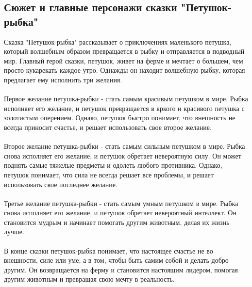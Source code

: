 \documentclass{article}
\begin{document}
\subsection{Сюжет и главные персонажи сказки "{}{}Петушок-рыбка"{}{}}
Сказка "{}{}Петушок-рыбка"{}{} рассказывает о приключениях маленького петушка, который волшебным образом превращается в рыбку и отправляется в подводный мир. Главный герой сказки, петушок, живет на ферме и мечтает о большем, чем просто кукарекать каждое утро. Однажды он находит волшебную рыбку, которая предлагает ему исполнить три желания.\\
~\\
Первое желание петушка-рыбки - стать самым красивым петушком в мире. Рыбка исполняет его желание, и петушок превращается в яркого и красивого петушка с золотистым оперением. Однако, петушок быстро понимает, что внешность не всегда приносит счастье, и решает использовать свое второе желание.\\
~\\
Второе желание петушка-рыбки - стать самым сильным петушком в мире. Рыбка снова исполняет его желание, и петушок обретает невероятную силу. Он может поднять самые тяжелые предметы и одолеть любого противника. Однако, петушок понимает, что сила не всегда решает все проблемы, и решает использовать свое последнее желание.\\
~\\
Третье желание петушка-рыбки - стать самым умным петушком в мире. Рыбка снова исполняет его желание, и петушок обретает невероятный интеллект. Он становится мудрым и начинает помогать другим животным, делая их жизнь лучше.\\
~\\
В конце сказки петушок-рыбка понимает, что настоящее счастье не во внешности, силе или уме, а в том, чтобы быть самим собой и делать добро другим. Он возвращается на ферму и становится настоящим лидером, помогая другим животным и превращая свою мечту в реальность.\\
~\\

\newpage
\end{document}
